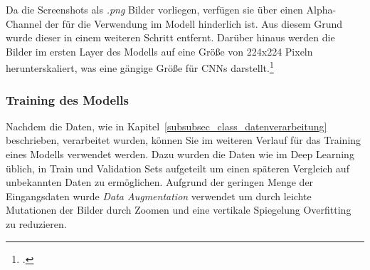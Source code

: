 Da die Screenshots als \textit{.png} Bilder vorliegen, verfügen sie über einen Alpha-Channel der für die Verwendung im Modell hinderlich ist.
Aus diesem Grund wurde dieser in einem weiteren Schritt entfernt.
Darüber hinaus werden die Bilder im ersten Layer des Modells auf eine Größe von 224x224 Pixeln herunterskaliert, was eine gängige Größe für \aclp{CNN} darstellt.\footcite[\vglf][]{ghosh2019}


\subsubsection{Training des Modells}\label{subsubsec_class_training}
Nachdem die Daten, wie in Kapitel~\ref{subsubsec_class_datenverarbeitung} beschrieben, verarbeitet wurden, können Sie im weiteren Verlauf für das Training eines Modells verwendet werden.
Dazu wurden die Daten wie im Deep Learning üblich, in Train und Validation Sets aufgeteilt um einen späteren Vergleich auf unbekannten Daten zu ermöglichen.
Aufgrund der geringen Menge der Eingangsdaten wurde \textit{Data Augmentation} verwendet um durch leichte Mutationen der Bilder durch Zoomen und eine vertikale Spiegelung Overfitting zu reduzieren.
